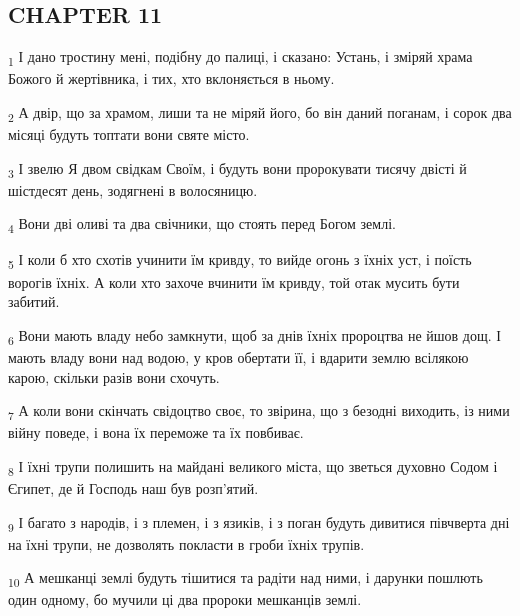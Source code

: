 \subsection{CHAPTER 11}
\begin{tcolorbox}
\textsubscript{1} І дано тростину мені, подібну до палиці, і сказано: Устань, і зміряй храма Божого й жертівника, і тих, хто вклоняється в ньому.
\end{tcolorbox}
\begin{tcolorbox}
\textsubscript{2} А двір, що за храмом, лиши та не міряй його, бо він даний поганам, і сорок два місяці будуть топтати вони святе місто.
\end{tcolorbox}
\begin{tcolorbox}
\textsubscript{3} І звелю Я двом свідкам Своїм, і будуть вони пророкувати тисячу двісті й шістдесят день, зодягнені в волосяницю.
\end{tcolorbox}
\begin{tcolorbox}
\textsubscript{4} Вони дві оливі та два свічники, що стоять перед Богом землі.
\end{tcolorbox}
\begin{tcolorbox}
\textsubscript{5} І коли б хто схотів учинити їм кривду, то вийде огонь з їхніх уст, і поїсть ворогів їхніх. А коли хто захоче вчинити їм кривду, той отак мусить бути забитий.
\end{tcolorbox}
\begin{tcolorbox}
\textsubscript{6} Вони мають владу небо замкнути, щоб за днів їхніх пророцтва не йшов дощ. І мають владу вони над водою, у кров обертати її, і вдарити землю всілякою карою, скільки разів вони схочуть.
\end{tcolorbox}
\begin{tcolorbox}
\textsubscript{7} А коли вони скінчать свідоцтво своє, то звірина, що з безодні виходить, із ними війну поведе, і вона їх переможе та їх повбиває.
\end{tcolorbox}
\begin{tcolorbox}
\textsubscript{8} І їхні трупи полишить на майдані великого міста, що зветься духовно Содом і Єгипет, де й Господь наш був розп'ятий.
\end{tcolorbox}
\begin{tcolorbox}
\textsubscript{9} І багато з народів, і з племен, і з язиків, і з поган будуть дивитися півчверта дні на їхні трупи, не дозволять покласти в гроби їхніх трупів.
\end{tcolorbox}
\begin{tcolorbox}
\textsubscript{10} А мешканці землі будуть тішитися та радіти над ними, і дарунки пошлють один одному, бо мучили ці два пророки мешканців землі.
\end{tcolorbox}
